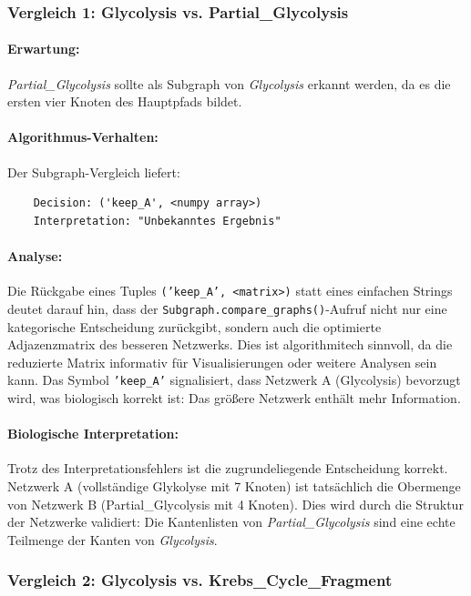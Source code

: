 ﻿\documentclass[a4paper,12pt]{article}
\theoremstyle{definition}
\begin{document}
\subsubsection{Vergleich 1: Glycolysis vs. Partial\_Glycolysis}

\paragraph{Erwartung:}
\textit{Partial\_Glycolysis} sollte als Subgraph von \textit{Glycolysis} erkannt werden, da es die ersten vier Knoten des Hauptpfads bildet.

\paragraph{Algorithmus-Verhalten:}
Der Subgraph-Vergleich liefert:
\begin{verbatim}
	Decision: ('keep_A', <numpy array>)
	Interpretation: "Unbekanntes Ergebnis"
\end{verbatim}

\paragraph{Analyse:}
Die Rückgabe eines Tuples \texttt{('keep\_A', <matrix>)} statt eines einfachen Strings deutet darauf hin, dass der \texttt{Subgraph.compare\_graphs()}-Aufruf nicht nur eine kategorische Entscheidung zurückgibt, sondern auch die optimierte Adjazenzmatrix des besseren Netzwerks. Dies ist algorithmitech sinnvoll, da die reduzierte Matrix informativ für Visualisierungen oder weitere Analysen sein kann. Das Symbol \texttt{'keep\_A'} signalisiert, dass Netzwerk A (Glycolysis) bevorzugt wird, was biologisch korrekt ist: Das größere Netzwerk enthält mehr Information.

\paragraph{Biologische Interpretation:}
Trotz des Interpretationsfehlers ist die zugrundeliegende Entscheidung korrekt. Netzwerk A (vollständige Glykolyse mit 7 Knoten) ist tatsächlich die Obermenge von Netzwerk B (Partial\_Glycolysis mit 4 Knoten). Dies wird durch die Struktur der Netzwerke validiert: Die Kantenlisten von \textit{Partial\_Glycolysis} sind eine echte Teilmenge der Kanten von \textit{Glycolysis}.

\subsubsection{Vergleich 2: Glycolysis vs. Krebs\_Cycle\_Fragment}
\end{document}

